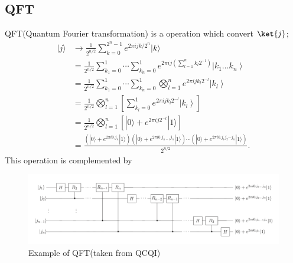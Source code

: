 \documentclass[b5paper,papersize,dvipdfmx,fleqn]{jsarticle}
\begin{document}
\subsection{QFT}
QFT(Quantum Fourier transformation) is a operation which convert $\ket{j}$;
$$
\begin{aligned}
|j\rangle & \rightarrow \frac{1}{2^{n / 2}} \sum_{k=0}^{2^{n}-1} e^{2 \pi i j k / 2^{n}}|k\rangle \\
&=\frac{1}{2^{n / 2}} \sum_{k_{1}=0}^{1} \cdots \sum_{k_{n}=0}^{1} e^{2 \pi i j\left(\sum_{l=1}^{n} k_{l} 2^{-l}\right)}\left|k_{1} \ldots k_{n}\right\rangle \\
&=\frac{1}{2^{n / 2}} \sum_{k_{1}=0}^{1} \cdots \sum_{k_{n}=0}^{1} \bigotimes_{l=1}^{n} e^{2 \pi i j k_{l} 2^{-l}}\left|k_{l}\right\rangle \\
&=\frac{1}{2^{n / 2}} \bigotimes_{l=1}^{n}\left[\sum_{k_{l}=0}^{1} e^{2 \pi i j k_{l} 2^{-l}}\left|k_{l}\right\rangle\right] \\
&=\frac{1}{2^{n / 2}} \bigotimes_{l=1}^{n}\left[|0\rangle+e^{2 \pi i j 2^{-l}}|1\rangle\right] \\
&=\frac{\left(|0\rangle+e^{2 \pi i 0 . j_{n}}|1\rangle\right)\left(|0\rangle+e^{2 \pi i 0 . j_{n-1} j_{n}}|1\rangle\right) \cdots\left(|0\rangle+e^{2 \pi i 0 . j_{1} j_{2} \cdots j_{n}}|1\rangle\right)}{2^{n / 2}} .
\end{aligned}
$$
This operation is complemented by
\begin{center}
  \begin{figure}[H]
       \includegraphics[width=\textwidth]{qft.pdf}
       \caption{Example of QFT(taken from QCQI)}
       \label{circuit}
  \end{figure}
\end{center}
\end{document}
